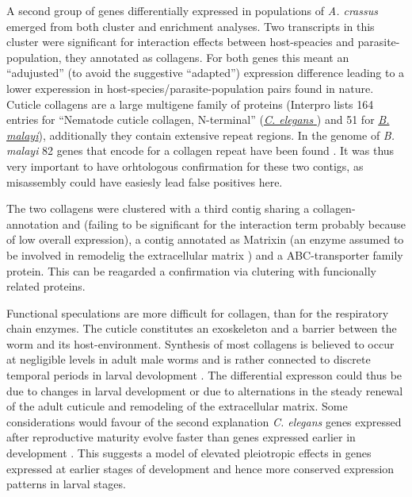 A second group of genes differentially expressed in populations of
\textit{A. crassus} emerged from both cluster and enrichment
analyses. Two transcripts in this cluster were significant for
interaction effects between host-speacies and parasite-population,
they annotated as collagens. For both genes this meant an
``adujusted'' (to avoid the suggestive ``adapted'') expression
difference leading to a lower experession in
host-species/parasite-population pairs found in nature. Cuticle
collagens are a large multigene family of proteins (Interpro lists 164
entries for ``Nematode cuticle collagen, N-terminal''
(\href{http://www.ebi.ac.uk/interpro/ISpy?ipr=IPR002486&tax=6239}{\textit{C. elegans}
}) and 51 for
\href{http://www.ebi.ac.uk/interpro/ISpy?ipr=IPR002486&tax=6279}{\textit{B. malayi}}),
additionally they contain extensive repeat regions. In the genome of
\textit{B. malayi} 82 genes that encode for a collagen repeat have
been found \cite{ghedin_draft_2007}. It was thus very important to
have orhtologous confirmation for these two contigs, as misassembly
could have easiesly lead false positives here.

The two collagens were clustered with a third contig sharing a
collagen-annotation and (failing to be significant for the interaction
term probably because of low overall expression), a contig annotated
as Matrixin (an enzyme assumed to be involved in remodelig the
extracellular matrix \cite{mealloprot}) and a ABC-transporter family
protein. This can be reagarded a confirmation via clutering with
funcionally related proteins.

Functional speculations are more difficult for collagen, than for the
respiratory chain enzymes. The cuticle constitutes an exoskeleton and
a barrier between the worm and its host-environment. Synthesis of most
collagens is believed to occur at negligible levels in adult male
worms and is rather connected to discrete temporal periods in larval
devolopment \cite{pmid10637627}. The differential expresson could thus
be due to changes in larval development or due to alternations in the
steady renewal of the adult cuticule and remodeling of the
extracellular matrix. Some considerations would favour of the second
explanation \textit{C. elegans} genes expressed after reproductive
maturity evolve faster than genes expressed earlier in development
\cite{pmid15371532}. This suggests a model of elevated pleiotropic
effects in genes expressed at earlier stages of development and hence
more conserved expression patterns in larval stages.

